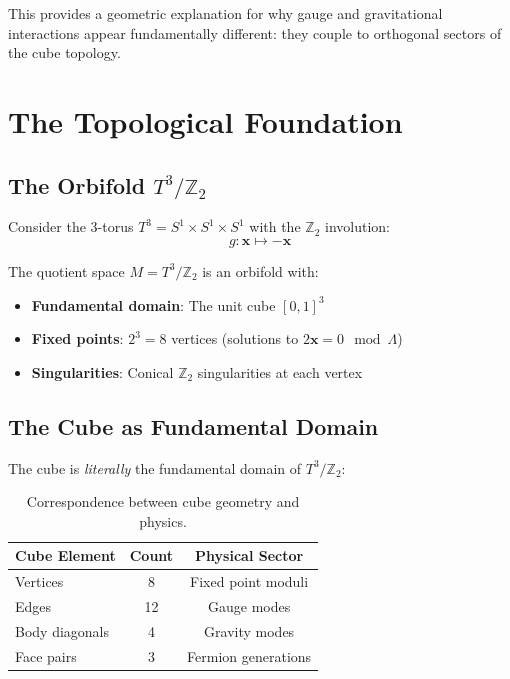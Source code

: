 \documentclass[12pt,a4paper]{article}
\newcommand{\Ztwo}{\mathbb{Z}_2}
\newcommand{\Tthree}{T^3}
\begin{document}
This provides a geometric explanation for why gauge and gravitational interactions appear fundamentally different: they couple to orthogonal sectors of the cube topology.

\section{The Topological Foundation}
\label{sec:topology}

\subsection{The Orbifold $\Tthree/\Ztwo$}

Consider the 3-torus $\Tthree = S^1 \times S^1 \times S^1$ with the $\Ztwo$ involution:
\begin{equation}
g: \mathbf{x} \mapsto -\mathbf{x}
\end{equation}

The quotient space $M = \Tthree/\Ztwo$ is an orbifold with:
\begin{itemize}
    \item \textbf{Fundamental domain}: The unit cube $[0,1]^3$
    \item \textbf{Fixed points}: $2^3 = 8$ vertices (solutions to $2\mathbf{x} = 0 \mod \Lambda$)
    \item \textbf{Singularities}: Conical $\Ztwo$ singularities at each vertex
\end{itemize}

\subsection{The Cube as Fundamental Domain}

The cube is \emph{literally} the fundamental domain of $\Tthree/\Ztwo$:

\begin{table}[H]
\centering
\begin{tabular}{lcc}
\toprule
\textbf{Cube Element} & \textbf{Count} & \textbf{Physical Sector} \\
\midrule
Vertices & 8 & Fixed point moduli \\
Edges & 12 & Gauge modes \\
Body diagonals & 4 & Gravity modes \\
Face pairs & 3 & Fermion generations \\
\bottomrule
\end{tabular}
\caption{Correspondence between cube geometry and physics.}
\label{tab:cube}
\end{table}
\end{document}
